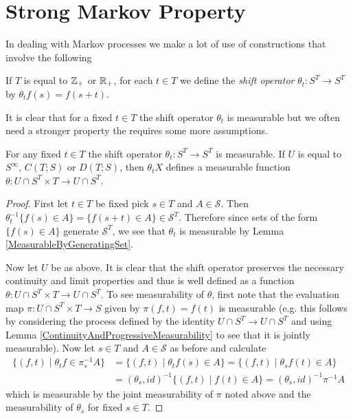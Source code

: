 \section{Strong Markov Property}

In dealing with Markov processes we make a lot of use of constructions
that involve the following
\begin{defn}If $T$ is equal to $\mathbb{Z}_+$ or $\mathbb{R}_+$, for each
  $t \in T$ we define
  the \emph{shift operator}  $\theta_t : S^T \to S^T$ by $\theta_t f
  (s) = f(s +t)$.
\end{defn}

It is clear that for a fixed $t \in T$ the shift operator $\theta_t$
is measurable but we often need a stronger property the requires some
more assumptions.
\begin{lem}\label{MeasurabilityOfShiftOperator}For any fixed $t \in T$ the shift operator $\theta_t : S^T
  \to S^T$ is measurable. If $U$ is equal to $S^\infty$, $C(T; S)$ or
  $D(T; S)$, then $\theta_t X$ defines a measurable function $\theta : U \cap S^T \times
  T \to U \cap S^T$.  
\end{lem}
\begin{proof}
First let $t \in T$ be fixed pick $s \in T$ and $A \in \mathcal{S}$.
Then $\theta_t^{-1} \lbrace f(s) \in A \rbrace = \lbrace f(s+t) \in A
\rbrace \in \mathcal{S}^T$.  Therefore since sets of the form $\lbrace f(s) \in A \rbrace$ generate
$\mathcal{S}^T$, we see that $\theta_t$ is measurable by Lemma
\ref{MeasurableByGeneratingSet}.

Now let $U$ be as above.  It is clear that the shift operator
preserves the necessary continuity and limit properties and thus is
well defined as a function $\theta : U \cap S^T \times T \to U \cap S^T$.  To
see measurability of $\theta$, first note that the evaluation map $\pi : U \cap S^T \times
T \to S$ given by $\pi(f,t) = f(t)$ is measurable (e.g. this follows
by considering the process defined by the identity $U
\cap S^T \to U \cap S^T$ and using Lemma
\ref{ContinuityAndProgressiveMeasurability} to see that it is jointly
measurable).
Now let $s \in T$ and $A
\in \mathcal{S}$ as before and calculate
\begin{align*}
\lbrace (f, t) \mid \theta_t f \in \pi_s^{-1} A \rbrace
&=
\lbrace (f, t) \mid \theta_t f(s) \in  A \rbrace 
=\lbrace (f, t) \mid \theta_s f(t) \in  A \rbrace \\
&= (\theta_s, id)^{-1} \lbrace (f, t) \mid f(t) \in  A \rbrace
= (\theta_s, id)^{-1} \pi^{-1} A
\end{align*}
which is measurable by the joint measurability of $\pi$ noted above
and the measurability of $\theta_s$ for fixed $s \in T$.
\end{proof}

